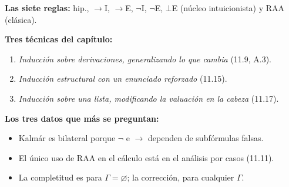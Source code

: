 \documentclass[11pt,a4paper]{article}
\newcommand{\Imp}{\rightarrow}
\newcommand{\Not}{\neg}
\begin{document}
\textbf{Las siete reglas:} hip., \(\Imp\)I, \(\Imp\)E, \(\Not\)I, \(\Not\)E,
\(\bot\)E (núcleo intuicionista) y RAA (clásica).

\textbf{Tres técnicas del capítulo:}
\begin{enumerate}
  \item \emph{Inducción sobre derivaciones, generalizando lo que cambia}
    (11.9, A.3).
  \item \emph{Inducción estructural con un enunciado reforzado} (11.15).
  \item \emph{Inducción sobre una lista, modificando la valuación en la
    cabeza} (11.17).
\end{enumerate}

\textbf{Los tres datos que más se preguntan:}
\begin{itemize}
  \item Kalmár es bilateral porque \(\Not\) e \(\Imp\) dependen de
    subfórmulas falsas.
  \item El único uso de RAA en el cálculo está en el análisis por casos
    (11.11).
  \item La completitud es para \(\Gamma=\varnothing\); la corrección, para
    cualquier \(\Gamma\).
\end{itemize}
\end{document}
